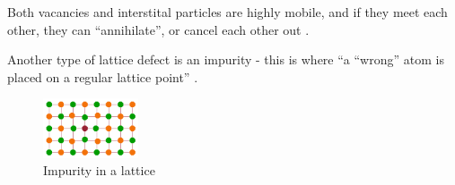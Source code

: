 \documentclass{article}
\begin{document}
    Both vacancies and interstital particles are highly mobile, and if they
    meet each other, they can ``annihilate'', or cancel each other out
    \cite{LatticeDefects}.

    Another type of lattice defect is an impurity - this is where ``a ``wrong''
    atom is placed on a regular lattice point'' \cite{LatticeDefects}.
    \begin{figure}[h]
        \includegraphics[width=0.25\textwidth]{impurity}
        \centering
        \caption{Impurity in a lattice}
    \end{figure}
\nocite{DoITPoMS}
\nocite{JimBook}
\nocite{HowItWorks}
{}

\end{document}
